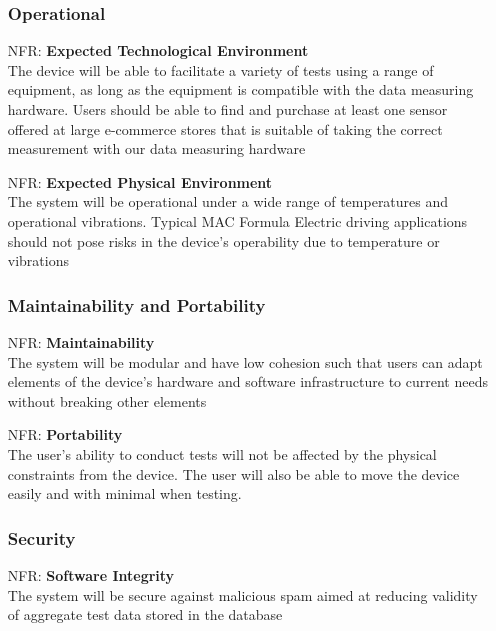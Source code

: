 \documentclass[12pt]{article}
\newcounter{nfrnum} %
\begin{document}
\begin{itemize}
\subsubsection{Operational}

    \item[NFR\refstepcounter{nfrnum}\thenfrnum:]
      \textbf{Expected Technological Environment}\\
    The device will be able to facilitate a variety of tests using a range of equipment, as long as the equipment is compatible with the data measuring hardware. Users should be able to find and purchase at least one sensor offered at large e-commerce stores that is suitable of taking the correct measurement with our data measuring hardware

    \item[NFR\refstepcounter{nfrnum}\thenfrnum:]
    \textbf{Expected Physical Environment}\\
    The system will be operational under a wide range of temperatures and operational vibrations. Typical MAC Formula Electric driving applications should not pose risks in the device's operability due to temperature or vibrations

\subsubsection{Maintainability and Portability}

    \item[NFR\refstepcounter{nfrnum}\thenfrnum:]
      \textbf{Maintainability}\\
    The system will be modular and have low cohesion such that users can adapt elements of the device's hardware and software infrastructure to current needs without breaking other elements

    \item[NFR\refstepcounter{nfrnum}\thenfrnum:]
    \textbf{Portability}\\
    The user's ability to conduct tests will not be affected by the physical constraints from the device. The user will also be able to move the device easily and with minimal when testing.
  
\subsubsection{Security}

    \item[NFR\refstepcounter{nfrnum}\thenfrnum:]
    \textbf{Software Integrity}\\
    The system will be secure against malicious spam aimed at reducing validity of aggregate test data stored in the database

\end{itemize}
\end{document}
